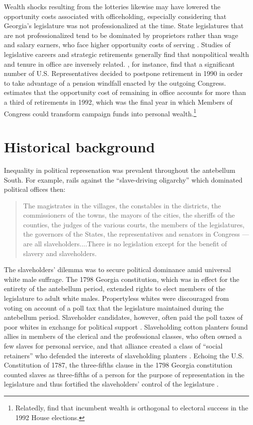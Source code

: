 Wealth shocks resulting from the lotteries likewise may have lowered the opportunity costs associated with officeholding, especially considering that Georgia's legislature was not professionalized at the time. State legislatures that are not professionalized tend to be dominated by proprietors rather than wage and salary earners, who face higher opportunity costs of serving \citep{fiorina1994,fiorina1999}. Studies of legislative careers and strategic retirements generally find that nonpolitical wealth and tenure in office are inversely related. \citet{hall1995}, for instance, find that a significant number of U.S. Representatives decided to postpone retirement in 1990 in order to take advantage of a pension windfall enacted by the outgoing Congress. \citet{groseclose1994} estimates that the opportunity cost of remaining in office accounts for more than a third of retirements in 1992, which was the final year in which Members of Congress could transform campaign funds into personal wealth.\footnote{Relatedly, \citet{milyo1999electoral} find that incumbent wealth is orthogonal to electoral success in the 1992 House elections.}

\section{Historical background} \label{history-ch2} 

Inequality in political represenation was prevalent throughout the antebellum South. For example, \citet{helper1860} rails against the ``slave-driving oligarchy'' which dominated political offices then: 
%
	\begin{quotation}The magistrates in the villages, the constables in the districts, the commissioners of the towns, the mayors of the cities, the sheriffs of the counties, the judges of the various courts, the members of the legislatures, the governors of the States, the representatives and senators in Congress --- are all slaveholders....There is no legislation except for the benefit of slavery and slaveholders.
	\end{quotation}  
%
The slaveholders' dilemma was to secure political dominance amid universal white male suffrage. The 1798 Georgia constitution, which was in effect for the entirety of the antebellum period, extended rights to elect members of the legislature to adult white males. Propertyless whites were discouraged from voting on account of a poll tax that the legislature maintained during the antebellum period. Slaveholder candidates, however, often paid the poll taxes of poor whites in exchange for political support \citep{meyers2012}. Slaveholding cotton planters found allies in members of the clerical and the professional classes, who often owned a few slaves for personal service, and that alliance created a class of ``social retainers'' who defended the interests of slaveholding planters \citep{simons1912}. Echoing the U.S. Constitution of 1787, the three-fifths clause in the 1798 Georgia constitution counted slaves as three-fifths of a person for the purpose of representation in the legislature and thus fortified the slaveholders' control of the legislature \citep{coulter1960}.

